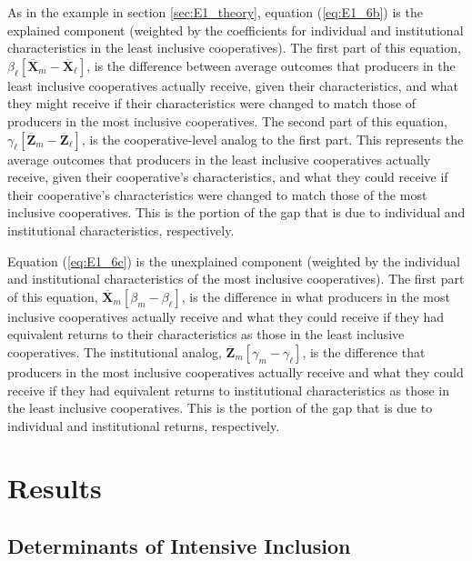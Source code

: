 \documentclass[11pt]{article}
\begin{document}
As in the example in section \ref{sec:E1_theory}, equation (\ref{eq:E1_6b}) is the explained component (weighted by the coefficients for individual and institutional characteristics in the least inclusive cooperatives). The first part of this equation, $\beta_{\ell}[\overline{\mathbf{X}}_{m} - \overline{\mathbf{X}}_{\ell}]$, is the difference between average outcomes that producers in the least inclusive cooperatives actually receive, given their characteristics, and what they might receive if their characteristics were changed to match those of producers in the most inclusive cooperatives. The second part of this equation, $\gamma_{\ell}[\overline{\mathbf{Z}}_{m} - \overline{\mathbf{Z}}_{\ell}]$, is the cooperative-level analog to the first part. This represents the average outcomes that producers in the least inclusive cooperatives actually receive, given their cooperative's characteristics, and what they could receive if their cooperative's characteristics were changed to match those of the most inclusive cooperatives. This is the portion of the gap that is due to individual and institutional characteristics, respectively.

Equation (\ref{eq:E1_6c}) is the unexplained component (weighted by the individual and institutional characteristics of the most inclusive cooperatives). The first part of this equation, $\overline{\mathbf{X}}_{m}[\beta_{m} - \beta_{\ell}]$, is the difference in what producers in the most inclusive cooperatives actually receive and what they could receive if they had equivalent returns to their characteristics as those in the least inclusive cooperatives. The institutional analog, $\overline{\mathbf{Z}}_{m}[\gamma_{m} - \gamma_{\ell}]$, is the difference that producers in the most inclusive cooperatives actually receive and what they could receive if they had equivalent returns to institutional characteristics as those in the least inclusive cooperatives. This is the portion of the gap that is due to individual and institutional returns, respectively.

\section{Results}

\subsection{Determinants of Intensive Inclusion}
\end{document}
